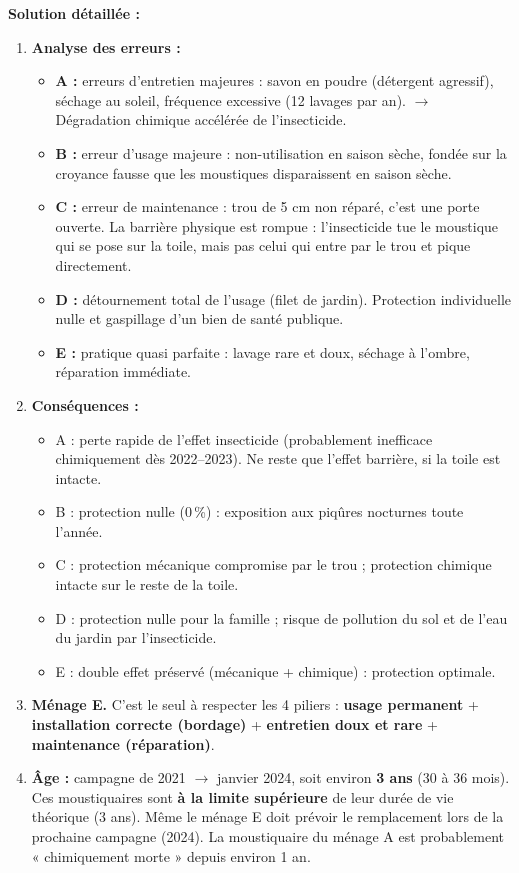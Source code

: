\documentclass[11pt]{article}
\begin{document}
\begin{exoresolu}
\tcblower
\textbf{Solution détaillée :}
\begin{enumerate}
    \item \textbf{Analyse des erreurs :}
    \begin{itemize}
        \item \textbf{A :} erreurs d'entretien majeures : savon en poudre (détergent agressif), séchage au soleil, fréquence excessive (12 lavages par an). $\to$ Dégradation chimique accélérée de l'insecticide.
        \item \textbf{B :} erreur d'usage majeure : non-utilisation en saison sèche, fondée sur la croyance fausse que les moustiques disparaissent en saison sèche.
        \item \textbf{C :} erreur de maintenance : trou de 5 cm non réparé, c'est une porte ouverte. La barrière physique est rompue : l'insecticide tue le moustique qui se pose sur la toile, mais pas celui qui entre par le trou et pique directement.
        \item \textbf{D :} détournement total de l'usage (filet de jardin). Protection individuelle nulle et gaspillage d'un bien de santé publique.
        \item \textbf{E :} pratique quasi parfaite : lavage rare et doux, séchage à l'ombre, réparation immédiate.
    \end{itemize}
    \item \textbf{Conséquences :}
    \begin{itemize}
        \item A : perte rapide de l'effet insecticide (probablement inefficace chimiquement dès 2022--2023). Ne reste que l'effet barrière, si la toile est intacte.
        \item B : protection nulle (0\,\%) : exposition aux piqûres nocturnes toute l'année.
        \item C : protection mécanique compromise par le trou ; protection chimique intacte sur le reste de la toile.
        \item D : protection nulle pour la famille ; risque de pollution du sol et de l'eau du jardin par l'insecticide.
        \item E : double effet préservé (mécanique + chimique) : protection optimale.
    \end{itemize}
    \item \textbf{Ménage E.} C'est le seul à respecter les 4 piliers : \textbf{usage permanent} + \textbf{installation correcte (bordage)} + \textbf{entretien doux et rare} + \textbf{maintenance (réparation)}.
    \item \textbf{Âge :} campagne de 2021 $\to$ janvier 2024, soit environ \textbf{3 ans} (30 à 36 mois). Ces moustiquaires sont \textbf{à la limite supérieure} de leur durée de vie théorique (3 ans). Même le ménage E doit prévoir le remplacement lors de la prochaine campagne (2024). La moustiquaire du ménage A est probablement « chimiquement morte » depuis environ 1 an.
\end{enumerate}
\end{exoresolu}
\end{document}
